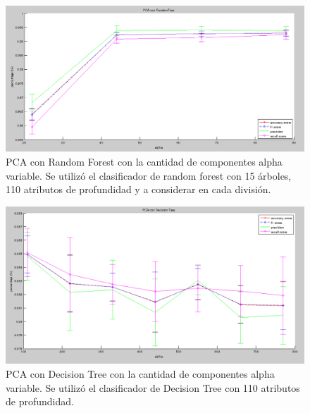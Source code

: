 \documentclass{article}
\begin{document}
\begin{figure}[H] %
\begin{center}
\includegraphics[width=500pt]{pcaRandomTreeZoom.png}
\caption{PCA con Random Forest con la cantidad de componentes alpha variable. Se utilizó el clasificador de random forest con 15 árboles, 110 atributos de profundidad y a considerar en cada división.}
\label{pcaRandomTreeZoom}
\end{center}
\end{figure}

\begin{figure}[H] %
\begin{center}
\includegraphics[width=500pt]{pcaDecisionTree.png}
\caption{PCA con Decision Tree con la cantidad de componentes alpha variable. Se utilizó el clasificador de Decision Tree con 110 atributos de profundidad.}
\label{pcaDecisionTree}
\end{center}
\end{figure}
\end{document}
